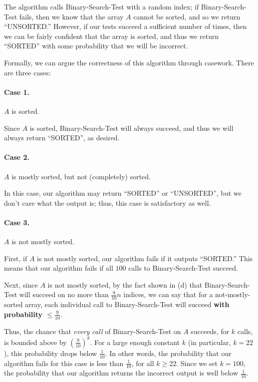 \documentclass{6046}
\begin{document}
The algorithm calls {\sc Binary-Search-Test} with a random index;
if {\sc Binary-Search-Test} fails, then we know that the array
$A$ cannot be sorted, and so we return ``UNSORTED.'' However,
if our tests succeed a sufficient number of times, then we
can be fairly confident that the array is sorted, and thus
we return ``SORTED'' with some probability that we will
be incorrect.

Formally, we can argue the correctness of this algorithm
through casework. There are three cases:
\vspace{-1.5em}

\paragraph{Case 1.} $A$ is sorted.
\vspace{-0.75em}

Since $A$ is sorted, {\sc Binary-Search-Test} will always succeed,
and thus we will always return ``SORTED'', as desired.
\vspace{-1em}

\paragraph{Case 2.} $A$ is mostly sorted, but not (completely) sorted.
\vspace{-0.75em}

In this case, our algorithm may return ``SORTED'' or ``UNSORTED'',
but we don't care what the output is; thus, this case is
satisfactory as well.
\vspace{-1em}

\paragraph{Case 3.} $A$ is not mostly sorted.
\vspace{-0.75em}

First, if $A$ is not mostly sorted, our algorithm fails
if it outputs ``SORTED.'' This means that our algorithm
fails if all $100$ calls to {\sc Binary-Search-Test} succeed.

Next, since $A$ is not mostly sorted, by the fact shown in (d) that
{\sc Binary-Search-Test} will succeed on no more than
$\frac{9}{10}n$ indices, we can say that
for a not-mostly-sorted array, each individual call to
{\sc Binary-Search-Test} will succeed {\bf with probability $\le \frac{9}{10}$}.

Thus, the chance that {\it every call} of
{\sc Binary-Search-Test} on $A$ succeeds, for $k$ calls,
is bounded above by $(\frac{9}{10})^k$. For a large
enough constant $k$ (in particular, $k = 22$), this probability
drops below $\frac{1}{10}$. In other words, the probability that
our algorithm fails for this case is less than $\frac{1}{10}$,
for all $k \ge 22$. Since we set $k = 100$, the probability that
our algorithm returns the incorrect output is well below $\frac{1}{10}$.
\end{document}
